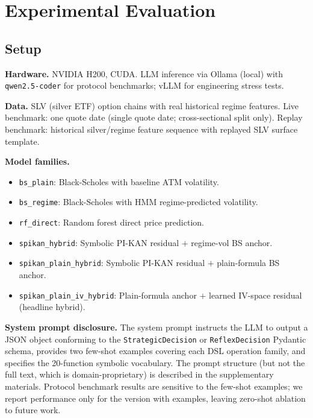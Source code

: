 \documentclass[11pt,a4paper]{article}
\begin{document}
\section{Experimental Evaluation}
\label{sec:experiments}

\subsection{Setup}
\label{sec:experiments:setup}

\textbf{Hardware.} NVIDIA H200, CUDA. LLM inference via Ollama (local) with
\texttt{qwen2.5-coder} for protocol benchmarks; vLLM for engineering stress tests.

\textbf{Data.} SLV (silver ETF) option chains with real historical regime features.
Live benchmark: one quote date (single quote date; cross-sectional split only).
Replay benchmark: historical silver/regime feature sequence with replayed SLV surface
template.

\textbf{Model families.}
\begin{itemize}[nosep]
  \item \texttt{bs\_plain}: Black-Scholes with baseline ATM volatility.
  \item \texttt{bs\_regime}: Black-Scholes with HMM regime-predicted volatility.
  \item \texttt{rf\_direct}: Random forest direct price prediction.
  \item \texttt{spikan\_hybrid}: Symbolic PI-KAN residual $+$ regime-vol BS anchor.
  \item \texttt{spikan\_plain\_hybrid}: Symbolic PI-KAN residual $+$ plain-formula BS anchor.
  \item \texttt{spikan\_plain\_iv\_hybrid}: Plain-formula anchor $+$ learned IV-space residual (headline hybrid).
\end{itemize}

\textbf{System prompt disclosure.} The system prompt instructs the LLM to output a
JSON object conforming to the \texttt{StrategicDecision} or \texttt{ReflexDecision}
Pydantic schema, provides two few-shot examples covering each DSL operation family,
and specifies the 20-function symbolic vocabulary. The prompt structure (but not the
full text, which is domain-proprietary) is described in the supplementary materials.
Protocol benchmark results are sensitive to the few-shot examples; we report performance
only for the version with examples, leaving zero-shot ablation to future work.
\end{document}
